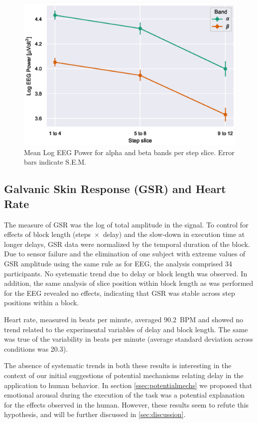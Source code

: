 \documentclass[10pt,letterpaper]{article}
\begin{document}
\begin{figure}[h]
    \centering
    \includegraphics[width=.8\textwidth]{plots/eeg_alpha_beta_vs_block_slice.eps}
    \caption{Mean Log EEG Power for alpha and beta bands per step slice. Error bars indicate S.E.M.}\label{fig:logeegpow:slices}
\end{figure}

\subsection{Galvanic Skin Response (GSR) and Heart Rate}
The measure of GSR was the log of total amplitude in the signal.
To control for effects of block length (steps~\( \times \)~delay) and the slow-down in execution time at longer delays, GSR data were normalized by the temporal duration of the block.
Due to sensor failure and the elimination of one subject with extreme values of GSR amplitude using the same rule as for EEG, the analysis comprised 34 participants.
No systematic trend due to delay or block length was observed.
In addition, the same analysis of slice position within block length as was performed for the EEG revealed no effects, indicating that GSR was stable across step positions within a block. 

Heart rate, measured in beats per minute, averaged \num{90.2}~BPM and showed no trend related to the experimental variables of delay and block length.
The same was true of the variability in beats per minute (average standard deviation across conditions was \num{20.3}).

The absence of systematic trends in both these results is interesting in the context of our initial suggestions of potential mechanisms relating delay in the application to human behavior.
In section \cref{ssec:potentialmechs} we proposed that emotional arousal during the execution of the task was a potential explanation for the effects observed in the human.
However, these results seem to refute this hypothesis, and will be further discussed in \cref{sec:discussion}.
\end{document}

